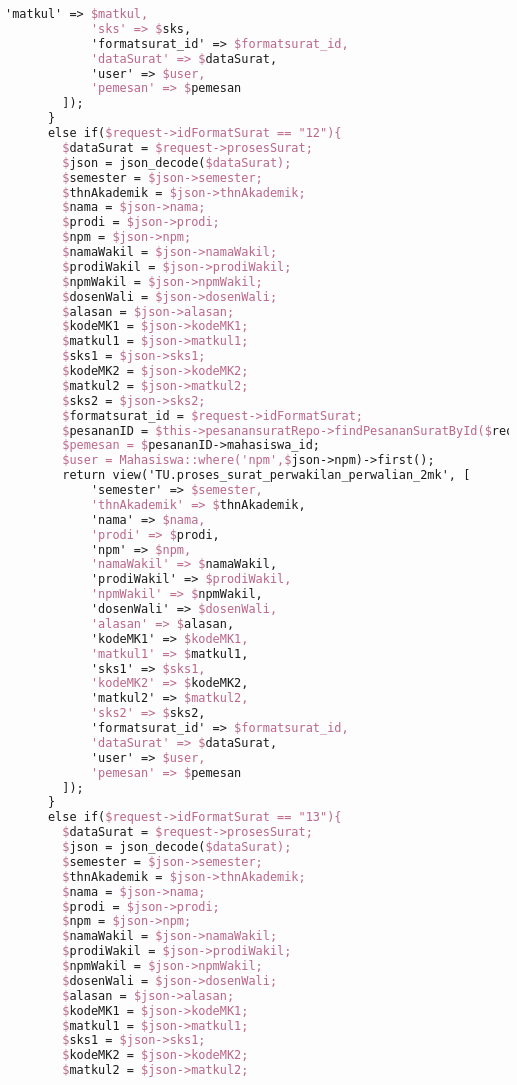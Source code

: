 \begin{lstlisting}[language=tex,basicstyle=\tiny,caption=PesanansuratController.php]
            'matkul' => $matkul,
            'sks' => $sks,
            'formatsurat_id' => $formatsurat_id,
            'dataSurat' => $dataSurat,
            'user' => $user,
            'pemesan' => $pemesan
        ]);
      }
      else if($request->idFormatSurat == "12"){
        $dataSurat = $request->prosesSurat;
        $json = json_decode($dataSurat);
        $semester = $json->semester;
        $thnAkademik = $json->thnAkademik;
        $nama = $json->nama;
        $prodi = $json->prodi;
        $npm = $json->npm;
        $namaWakil = $json->namaWakil;
        $prodiWakil = $json->prodiWakil;
        $npmWakil = $json->npmWakil;
        $dosenWali = $json->dosenWali;
        $alasan = $json->alasan;
        $kodeMK1 = $json->kodeMK1;
        $matkul1 = $json->matkul1;
        $sks1 = $json->sks1;
        $kodeMK2 = $json->kodeMK2;
        $matkul2 = $json->matkul2;
        $sks2 = $json->sks2;
        $formatsurat_id = $request->idFormatSurat;
        $pesananID = $this->pesanansuratRepo->findPesananSuratById($request->id);
        $pemesan = $pesananID->mahasiswa_id;
        $user = Mahasiswa::where('npm',$json->npm)->first();
        return view('TU.proses_surat_perwakilan_perwalian_2mk', [
            'semester' => $semester,
            'thnAkademik' => $thnAkademik,
            'nama' => $nama,
            'prodi' => $prodi,
            'npm' => $npm,
            'namaWakil' => $namaWakil,
            'prodiWakil' => $prodiWakil,
            'npmWakil' => $npmWakil,
            'dosenWali' => $dosenWali,
            'alasan' => $alasan,
            'kodeMK1' => $kodeMK1,
            'matkul1' => $matkul1,
            'sks1' => $sks1,
            'kodeMK2' => $kodeMK2,
            'matkul2' => $matkul2,
            'sks2' => $sks2,
            'formatsurat_id' => $formatsurat_id,
            'dataSurat' => $dataSurat,
            'user' => $user,
            'pemesan' => $pemesan
        ]);
      }
      else if($request->idFormatSurat == "13"){
        $dataSurat = $request->prosesSurat;
        $json = json_decode($dataSurat);
        $semester = $json->semester;
        $thnAkademik = $json->thnAkademik;
        $nama = $json->nama;
        $prodi = $json->prodi;
        $npm = $json->npm;
        $namaWakil = $json->namaWakil;
        $prodiWakil = $json->prodiWakil;
        $npmWakil = $json->npmWakil;
        $dosenWali = $json->dosenWali;
        $alasan = $json->alasan;
        $kodeMK1 = $json->kodeMK1;
        $matkul1 = $json->matkul1;
        $sks1 = $json->sks1;
        $kodeMK2 = $json->kodeMK2;
        $matkul2 = $json->matkul2;

\end{lstlisting}
